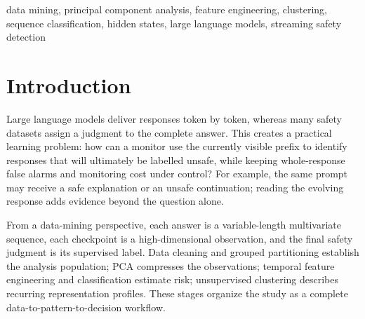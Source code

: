 \begin{abstract}
High-dimensional hidden-state streams offer a data source for mining the evolving safety risk of large language model responses. We develop a reproducible workflow integrating data cleaning, dimensionality reduction, feature engineering, sequence classification and cluster analysis. Frozen Qwen2.5 states are compressed by train-only incremental principal component analysis (PCA); state differences and geometric changes describe prefix evolution. Term frequency--inverse document frequency (TF--IDF) and linear probes provide text and representation baselines, while a gated recurrent unit (GRU) models the feature sequence. Independent sequence-level calibration converts scores into streaming decisions, and K-means profiles the structure of response representations. \ReviewRankingEN{} \AbstractResultsEN{} Static and temporal detectors provide distinct recall--false-positive-rate profiles. Shared feature caches and a buffer-check-release interface connect offline data mining with incremental operation, providing an accessible experimental framework for resource-conscious content-safety analysis.
\end{abstract}
\begin{IEEEkeywords}
data mining, principal component analysis, feature engineering, clustering, sequence classification, hidden states, large language models, streaming safety detection
\end{IEEEkeywords}

\section{Introduction}
Large language models deliver responses token by token, whereas many safety datasets assign a judgment to the complete answer. This creates a practical learning problem: how can a monitor use the currently visible prefix to identify responses that will ultimately be labelled unsafe, while keeping whole-response false alarms and monitoring cost under control? For example, the same prompt may receive a safe explanation or an unsafe continuation; reading the evolving response adds evidence beyond the question alone.

From a data-mining perspective, each answer is a variable-length multivariate sequence, each checkpoint is a high-dimensional observation, and the final safety judgment is its supervised label. Data cleaning and grouped partitioning establish the analysis population; PCA compresses the observations; temporal feature engineering and classification estimate risk; unsupervised clustering describes recurring representation profiles. These stages organize the study as a complete data-to-pattern-to-decision workflow.

